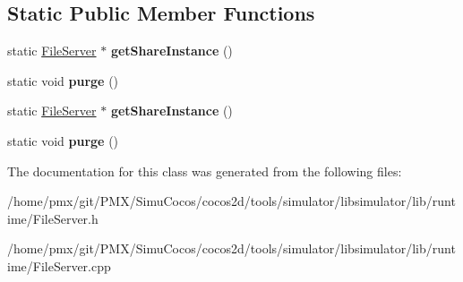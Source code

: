 \subsection*{Static Public Member Functions}
\begin{DoxyCompactItemize}
\item 
\mbox{\label{classFileServer_a39c78a01b7d81a8443737b4ffd5345ca}} 
static \hyperlink{classFileServer}{File\+Server} $\ast$ {\bfseries get\+Share\+Instance} ()
\item 
\mbox{\label{classFileServer_a59ac5fd877476cf82ed2c1bba8f3dd85}} 
static void {\bfseries purge} ()
\item 
\mbox{\label{classFileServer_aadb182160c5335845851371ecc353958}} 
static \hyperlink{classFileServer}{File\+Server} $\ast$ {\bfseries get\+Share\+Instance} ()
\item 
\mbox{\label{classFileServer_a766dc93e3acf3fde30515fb0edaf9483}} 
static void {\bfseries purge} ()
\end{DoxyCompactItemize}


The documentation for this class was generated from the following files\+:\begin{DoxyCompactItemize}
\item 
/home/pmx/git/\+P\+M\+X/\+Simu\+Cocos/cocos2d/tools/simulator/libsimulator/lib/runtime/File\+Server.\+h\item 
/home/pmx/git/\+P\+M\+X/\+Simu\+Cocos/cocos2d/tools/simulator/libsimulator/lib/runtime/File\+Server.\+cpp\end{DoxyCompactItemize}
